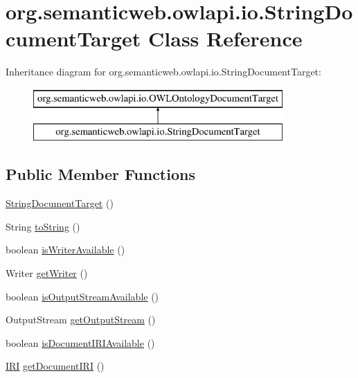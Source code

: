 \hypertarget{classorg_1_1semanticweb_1_1owlapi_1_1io_1_1_string_document_target}{\section{org.\-semanticweb.\-owlapi.\-io.\-String\-Document\-Target Class Reference}
\label{classorg_1_1semanticweb_1_1owlapi_1_1io_1_1_string_document_target}
}
Inheritance diagram for org.\-semanticweb.\-owlapi.\-io.\-String\-Document\-Target\-:\begin{figure}[H]
\begin{center}
\leavevmode
\includegraphics[height=2.000000cm]{classorg_1_1semanticweb_1_1owlapi_1_1io_1_1_string_document_target}
\end{center}
\end{figure}
\subsection*{Public Member Functions}
\begin{DoxyCompactItemize}
\item 
\hyperlink{classorg_1_1semanticweb_1_1owlapi_1_1io_1_1_string_document_target_a48e5df64569768f40c6b02ca1176fa08}{String\-Document\-Target} ()
\item 
String \hyperlink{classorg_1_1semanticweb_1_1owlapi_1_1io_1_1_string_document_target_af5f5ef173c2873e842f62eb94fb47222}{to\-String} ()
\item 
boolean \hyperlink{classorg_1_1semanticweb_1_1owlapi_1_1io_1_1_string_document_target_aec423e4e15b9f11c558613777c16c3f1}{is\-Writer\-Available} ()
\item 
Writer \hyperlink{classorg_1_1semanticweb_1_1owlapi_1_1io_1_1_string_document_target_adb54a613e4ca2bbb05654e3eefff40f7}{get\-Writer} ()
\item 
boolean \hyperlink{classorg_1_1semanticweb_1_1owlapi_1_1io_1_1_string_document_target_a1aa8d37aebefca78691905c686c34dbb}{is\-Output\-Stream\-Available} ()
\item 
Output\-Stream \hyperlink{classorg_1_1semanticweb_1_1owlapi_1_1io_1_1_string_document_target_a0a02d2d2281a066ad4626893ebb1fdec}{get\-Output\-Stream} ()
\item 
boolean \hyperlink{classorg_1_1semanticweb_1_1owlapi_1_1io_1_1_string_document_target_aa266387a53c94b9d57ceee42709ff823}{is\-Document\-I\-R\-I\-Available} ()
\item 
\hyperlink{classorg_1_1semanticweb_1_1owlapi_1_1model_1_1_i_r_i}{I\-R\-I} \hyperlink{classorg_1_1semanticweb_1_1owlapi_1_1io_1_1_string_document_target_acdbec7fbdff59aa664c17754e6f262f4}{get\-Document\-I\-R\-I} ()
\end{DoxyCompactItemize}
